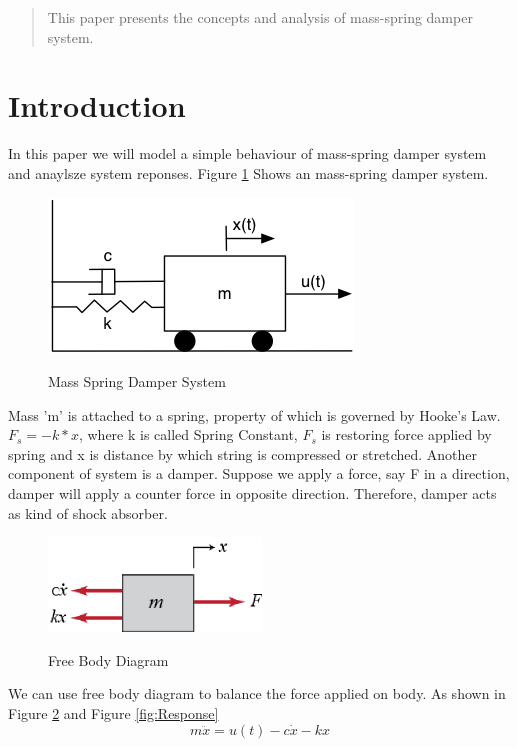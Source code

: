 \documentclass[a4paper,12pt,twocolumn]{article}
\begin{document}
\begin{abstract}

This paper presents the concepts and analysis of mass-spring damper system.  \cite{scipy}
 
\end{abstract}

\section{Introduction}
In this paper we will model a simple behaviour of mass-spring damper system and anaylsze system reponses.  Figure \ref{fig:block_diag} Shows an mass-spring damper system. 

\begin{figure}[!h]
\centering
\includegraphics[scale = 0.6]{block_diag}
\label{fig:block_diag}
\caption{Mass Spring Damper System}
\end{figure}

Mass 'm' is attached to a spring, property of which is governed by Hooke's Law. $F_s = -k*x$, where k is called Spring Constant, $F_s$ is restoring force applied by spring and x is distance by which string is compressed or stretched.  Another component of system is a damper. Suppose we apply a force, say F in a direction, damper will apply a counter force in opposite direction. Therefore, damper acts as kind of shock absorber. 

\begin{figure}[!h]
\centering
\includegraphics[scale = 0.6]{fbd}
\label{fig:fbd}
\caption{Free Body Diagram}
\end{figure}

We can use free body diagram to balance the force applied on body. As shown in Figure \ref{fig:fbd} and Figure \ref{fig:Response} \
\begin{equation}
 m \ddot{x} = u(t) - c \dot{x} - kx
 \label{equ:diff_equ}
\end{equation}
\end{document}
